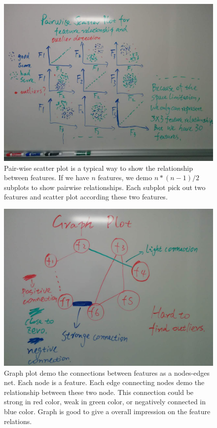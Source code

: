 \documentclass{article}
\begin{document}
\begin{figure}[H]
\centering
\includegraphics[scale=0.23]{pairwise_scatter.jpg}
\caption{Pair-wise scatter plot is a typical way to show the relationship between features. If we have $n$ features, we demo $n*(n-1)/2$ subplots to show pairwise relationships. Each subplot pick out two features and scatter plot according these two features.}
\end{figure}

\begin{figure}[H]
\centering
\includegraphics[scale=0.23]{graph.jpg}
\caption{Graph plot demo the connections between features as a nodes-edges net. Each node is a feature. Each edge connecting nodes demo the relationship between these two node. This connection could be strong in red color, weak in green color, or negatively connected in blue color. Graph is good to give a overall impression on the feature relations.}
\end{figure}
\end{document}
